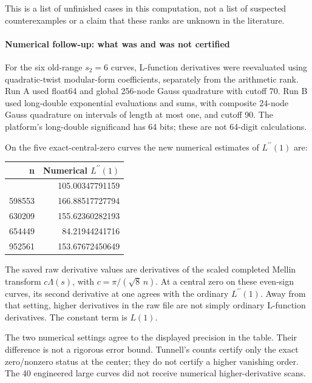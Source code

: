 \documentclass[11pt]{article}
\begin{document}
This is a list of unfinished cases in this computation, not a list of suspected counterexamples or a claim that these ranks are unknown in the literature.

\paragraph{Numerical follow-up: what was and was not certified}

For the six old-range \(s_2=6\) curves, L-function derivatives were reevaluated using quadratic-twist modular-form coefficients, separately from the arithmetic rank. Run A used float64 and global 256-node Gauss quadrature with cutoff 70. Run B used long-double exponential evaluations and sums, with composite 24-node Gauss quadrature on intervals of length at most one, and cutoff 90. The platform's long-double significand has 64 bits; these are not 64-digit calculations.

On the five exact-central-zero curves the new numerical estimates of \(L^{\prime\prime}(1)\) are:

\begingroup\small\setlength{\tabcolsep}{4pt}
\begin{longtable}[]{@{}rr@{}}
\toprule\noalign{}
n & Numerical \(L^{\prime\prime}(1)\) \\
\midrule\noalign{}
\endhead
\bottomrule\noalign{}
\endlastfoot
388841 & 105.00347791159 \\
598553 & 166.88517727794 \\
630209 & 155.62360282193 \\
654449 & 84.21944241716 \\
952561 & 153.67672450649 \\
\end{longtable}
\endgroup

The saved raw derivative values are derivatives of the scaled completed Mellin transform \(c\Lambda(s)\), with \(c=\pi/(\sqrt8\,n)\). At a central zero on these even-sign curves, its second derivative at one agrees with the ordinary \(L^{\prime\prime}(1)\). Away from that setting, higher derivatives in the raw file are not simply ordinary L-function derivatives. The constant term is \(L(1)\).

The two numerical settings agree to the displayed precision in the table. Their difference is not a rigorous error bound. Tunnell's counts certify only the exact zero/nonzero status at the center; they do not certify a higher vanishing order. The 40 engineered large curves did not receive numerical higher-derivative scans.
\end{document}
